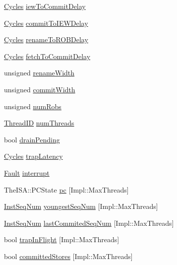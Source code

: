 \begin{DoxyCompactItemize}
\item 
\hyperlink{classCycles}{Cycles} \hyperlink{classDefaultCommit_a29f74b65419ba8f0ae250d65e960202b}{iewToCommitDelay}
\item 
\hyperlink{classCycles}{Cycles} \hyperlink{classDefaultCommit_a6b6fe1148ed7c40758e45f351c375552}{commitToIEWDelay}
\item 
\hyperlink{classCycles}{Cycles} \hyperlink{classDefaultCommit_af699b6479037861b3c0e17d4bfab001d}{renameToROBDelay}
\item 
\hyperlink{classCycles}{Cycles} \hyperlink{classDefaultCommit_a345f75b8236aa4fbe4ae976f8eb41a4c}{fetchToCommitDelay}
\item 
unsigned \hyperlink{classDefaultCommit_a4b41704382bddb6ee06b5ce97b47dd7b}{renameWidth}
\item 
unsigned \hyperlink{classDefaultCommit_aeab15260a0ccc0ea470bb74344b63d17}{commitWidth}
\item 
unsigned \hyperlink{classDefaultCommit_a35ee8ef405428b8d8595176ea6581681}{numRobs}
\item 
\hyperlink{base_2types_8hh_ab39b1a4f9dad884694c7a74ed69e6a6b}{ThreadID} \hyperlink{classDefaultCommit_a88377f855dbf5adeeecb06b5bb821d35}{numThreads}
\item 
bool \hyperlink{classDefaultCommit_a547316e5bf0dc6115209737cf68e9bb8}{drainPending}
\item 
\hyperlink{classCycles}{Cycles} \hyperlink{classDefaultCommit_a0bfffaa2e5f9c7e79353e61146950a9a}{trapLatency}
\item 
\hyperlink{classRefCountingPtr}{Fault} \hyperlink{classDefaultCommit_a7387b2358d0f884ccd5c383e6199f035}{interrupt}
\item 
TheISA::PCState \hyperlink{classDefaultCommit_a6e6091c9272a281b8693c0f46279cad0}{pc} \mbox{[}Impl::MaxThreads\mbox{]}
\item 
\hyperlink{inst__seq_8hh_a258d93d98edaedee089435c19ea2ea2e}{InstSeqNum} \hyperlink{classDefaultCommit_a1d81dc5c05e15057c1985acc39285540}{youngestSeqNum} \mbox{[}Impl::MaxThreads\mbox{]}
\item 
\hyperlink{inst__seq_8hh_a258d93d98edaedee089435c19ea2ea2e}{InstSeqNum} \hyperlink{classDefaultCommit_a4feaee1ef312dda13cff064de20dfbf3}{lastCommitedSeqNum} \mbox{[}Impl::MaxThreads\mbox{]}
\item 
bool \hyperlink{classDefaultCommit_a4e366a325229901e41b68ff07e5f556a}{trapInFlight} \mbox{[}Impl::MaxThreads\mbox{]}
\item 
bool \hyperlink{classDefaultCommit_a0fd9fcb6eed99c11c7fa61c7218ecf49}{committedStores} \mbox{[}Impl::MaxThreads\mbox{]}

\end{DoxyCompactItemize}
